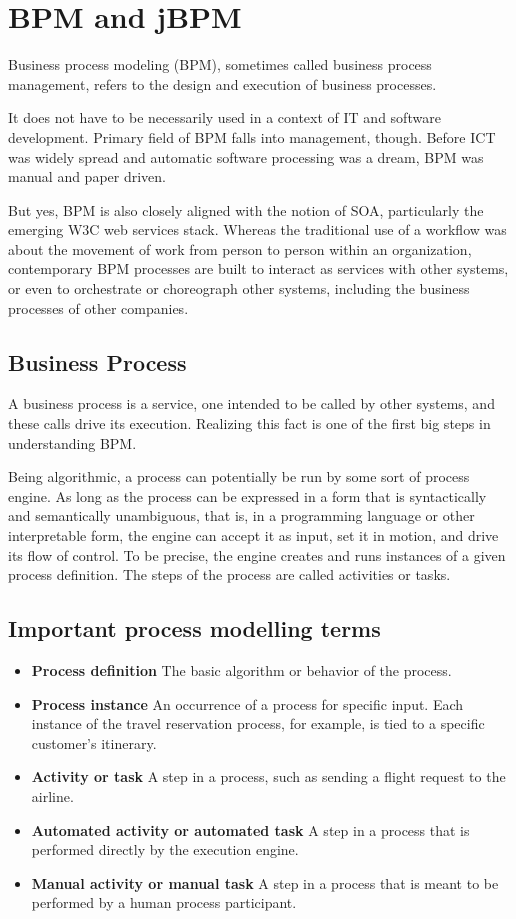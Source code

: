 \chapter{BPM and jBPM}\label{bpm}

	\cite{bpm}
	Business process modeling (BPM), sometimes called business process management, refers to the design and execution of
	business processes.
	
	It does not have to be necessarily used in a context of \gls{IT} and software development. Primary field of BPM falls
	into management, though. Before \gls{ICT} was widely spread and automatic software processing was a dream, BPM was
	manual and paper driven.

	But yes, BPM is also closely aligned with the notion of \gls{SOA}, particularly the emerging W3C web services
	stack. Whereas the traditional use of a workflow was about the movement of work from person to person within an
	organization, contemporary BPM processes are built to interact as services with other systems, or even to orchestrate
	or choreograph other systems, including the business processes of other companies.

	\section{Business Process}

	A business process is a service, one intended to be called by other systems, and these calls drive its execution.
	Realizing this fact is one of the first big steps in understanding BPM.
	
	Being algorithmic, a process can potentially be run by some sort of process engine. As long as the process can be
	expressed in a form that is syntactically and semantically unambiguous, that is, in a programming language or other
	interpretable form, the engine can accept it as input, set it in motion, and drive its flow of control. To be precise,
	the engine creates and runs instances of a given process definition. The steps of the process are called activities or
	tasks.
	
	\section{Important process modelling terms}
	\begin{itemize}
		\item \textbf{Process definition}
		The basic algorithm or behavior of the process.
		\item \textbf{Process instance}
		An occurrence of a process for specific input. Each instance of the travel reservation process, for example, is tied
		to a specific customer's itinerary.
		\item \textbf{Activity or task}
		A step in a process, such as sending a flight request to the airline.
		\item \textbf{Automated activity or automated task}
		A step in a process that is performed directly by the execution engine.
		\item \textbf{Manual activity or manual task}
		A step in a process that is meant to be performed by a human process participant. 
	\end{itemize}
	
